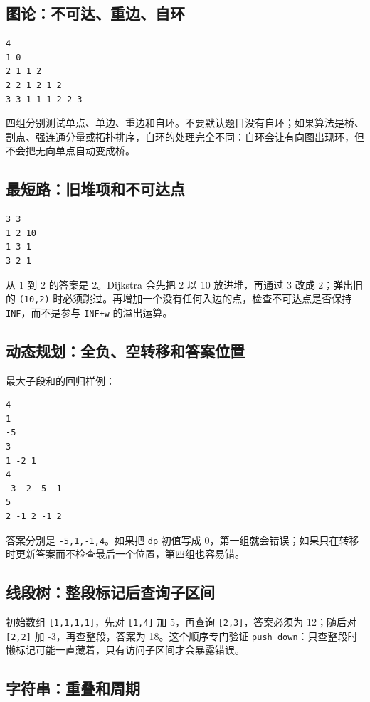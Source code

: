 \documentclass[UTF8,openany,oneside,zihao=-4]{ctexbook}
\begin{document}
\subsection{图论：不可达、重边、自环}

\begin{lstlisting}
4
1 0
2 1 1 2
2 2 1 2 1 2
3 3 1 1 1 2 2 3
\end{lstlisting}

四组分别测试单点、单边、重边和自环。不要默认题目没有自环；如果算法是桥、割点、强连通分量或拓扑排序，自环的处理完全不同：自环会让有向图出现环，但不会把无向单点自动变成桥。

\subsection{最短路：旧堆项和不可达点}

\begin{lstlisting}
3 3
1 2 10
1 3 1
3 2 1
\end{lstlisting}

从 1 到 2 的答案是 2。Dijkstra 会先把 2 以 10 放进堆，再通过 3 改成 2；弹出旧的 \lstinline|(10,2)| 时必须跳过。再增加一个没有任何入边的点，检查不可达点是否保持 \lstinline|INF|，而不是参与 \lstinline|INF+w| 的溢出运算。

\subsection{动态规划：全负、空转移和答案位置}

最大子段和的回归样例：

\begin{lstlisting}
4
1
-5
3
1 -2 1
4
-3 -2 -5 -1
5
2 -1 2 -1 2
\end{lstlisting}

答案分别是 \lstinline|-5,1,-1,4|。如果把 \lstinline|dp| 初值写成 0，第一组就会错误；如果只在转移时更新答案而不检查最后一个位置，第四组也容易错。

\subsection{线段树：整段标记后查询子区间}

初始数组 \lstinline|[1,1,1,1]|，先对 \lstinline|[1,4]| 加 5，再查询 \lstinline|[2,3]|，答案必须为 12；随后对 \lstinline|[2,2]| 加 -3，再查整段，答案为 18。这个顺序专门验证 \lstinline|push_down|：只查整段时懒标记可能一直藏着，只有访问子区间才会暴露错误。

\subsection{字符串：重叠和周期}
\end{document}
